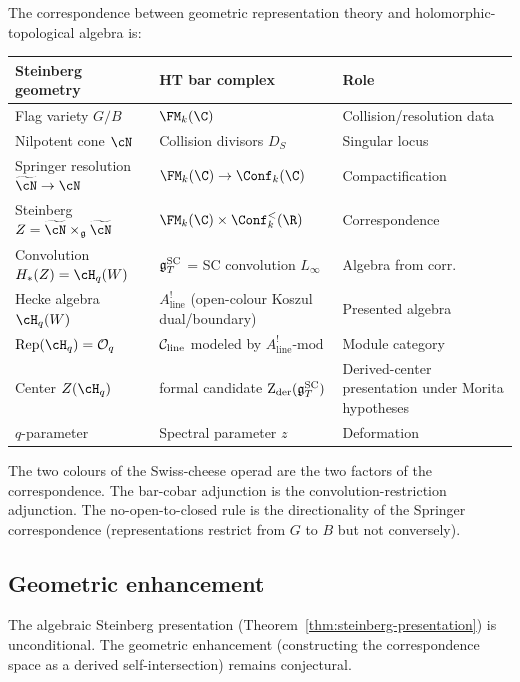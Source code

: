 \begin{remark}
The correspondence between geometric representation theory
and holomorphic-topological algebra is:
\begin{center}
\renewcommand{\arraystretch}{1.3}
\begin{tabular}{lll}
\hline
\textbf{Steinberg geometry} & \textbf{HT bar complex} & \textbf{Role} \\
\hline
Flag variety $G/B$ & $\FM_k(\C)$ & Collision/resolution data \\
Nilpotent cone $\cN$ & Collision divisors $D_S$ & Singular locus \\
Springer resolution $\widetilde\cN \to \cN$
 & $\FM_k(\C) \to \Conf_k(\C)$ & Compactification \\
Steinberg $Z = \widetilde\cN \times_{\mathfrak g} \widetilde\cN$
 & $\FM_k(\C) \times \Conf_k^{<}(\R)$ & Correspondence \\
Convolution $H_*(Z) = \cH_q(W)$
 & $\mathfrak{g}^{\mathrm{SC}}_T$ = SC convolution $L_\infty$ & Algebra from corr. \\
Hecke algebra $\cH_q(W)$
 & $A^!_{\mathrm{line}}$ (open-colour Koszul dual/boundary) & Presented algebra \\
$\mathrm{Rep}(\cH_q) = \cO_q$
 & $\mathcal C_{\mathrm{line}}$ modeled by $A^!_{\mathrm{line}}\text{-mod}$ & Module category \\
Center $Z(\cH_q)$
 & formal candidate $\operatorname{Z}_{\mathrm{der}}(\mathfrak{g}^{\mathrm{SC}}_T)$ & Derived-center presentation under Morita hypotheses \\
$q$-parameter
 & Spectral parameter $z$ & Deformation \\
\hline
\end{tabular}
\end{center}
The two colours of the Swiss-cheese operad are the two factors of
the correspondence. The bar-cobar adjunction is the
convolution-restriction adjunction. The no-open-to-closed rule
is the directionality of the Springer correspondence (representations
restrict from $G$ to $B$ but not conversely).
\end{remark}

\subsection{Geometric enhancement}

The algebraic Steinberg presentation
(Theorem~\ref{thm:steinberg-presentation}) is unconditional.
The geometric enhancement (constructing the correspondence space
as a derived self-intersection) remains conjectural.

